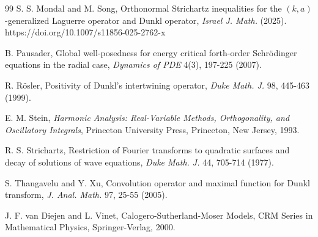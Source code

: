 \documentclass[a4paper,11pt, reqno]{amsart}
\theoremstyle{definition}
\theoremstyle{remark}
\numberwithin{equation}{section}
\begin{document}
\begin{thebibliography}{99}
         S. S. Mondal and  M. Song, {Orthonormal Strichartz inequalities for the $(k,a)$-generalized Laguerre operator and Dunkl operator}, \emph{Israel J. Math.} (2025). https://doi.org/10.1007/s11856-025-2762-x 

         B. Pausader, Global well-posedness for energy critical forth-order Schr\"odinger equations
in the radial case, \emph{Dynamics of PDE} 4(3), 197-225 (2007).
        
        R. R\"{o}sler, Positivity of Dunkl's intertwining operator,  \emph{Duke Math. J.} 98, 445-463 (1999). 

         E. M. Stein, \textit{Harmonic Analysis: Real-Variable Methods, Orthogonality, and Oscillatory Integrals}, Princeton University Press, Princeton, New Jersey, 1993.
						
          	R. S. Strichartz, Restriction of Fourier transforms to quadratic surfaces and decay of solutions of wave equations, \emph{Duke Math. J.} 44, 705-714 (1977). 
	 
         S. Thangavelu and  Y. Xu, {Convolution operator and maximal function for Dunkl transform}, \emph{J. Anal. Math.} {97}, 25-55 (2005).

        	 	J. F. van Diejen and L. Vinet, Calogero-Sutherland-Moser Models, CRM Series in Mathematical Physics, Springer-Verlag, 2000.
		
\end{thebibliography}

	
	
 
 
\end{document}
